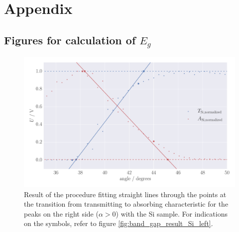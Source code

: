 \section{Appendix}

\subsection{Figures for calculation of $E_g$}
\label{sec:appendix_band_gap_plots}
\begin{figure}[htpb]
    \centering
    \includegraphics[width=1.0\linewidth]{figures/band_gap_result_Si_right}
    \caption{
        Result of the procedure fitting straight lines through the points 
        at the transition from transmitting to absorbing characteristic
        for the peaks on the right side ($\alpha > 0$) with the Si sample.
        For indications on the symbols, refer to figure 
        \ref{fig:band_gap_result_Si_left}. 
        }
    \label{fig:band_gap_result_Si_right}
\end{figure}
